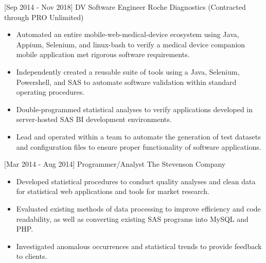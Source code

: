 \documentclass[]{moak-resume}
\begin{document}
\begin{entrylist}
  \entry
    {[Sep 2014 - Nov 2018]}
    {DV Software Engineer}
    {Roche Diagnostics (Contracted through PRO Unlimited)}
    {}
\end{entrylist}
\begin{itemize}
  \setlength\itemsep{-0.4em}
  \item \small\bodyfont Automated an entire mobile-web-medical-device ecosystem using Java, Appium, Selenium, and linux-bash to verify a medical device companion mobile application met rigorous software requirements.
  \item \small\bodyfont Independently created a reusable suite of tools using a Java, Selenium, Powershell, and SAS to automate software validation within standard operating procedures.
  \item \small\bodyfont Double-programmed statistical analyses to verify applications developed in server-hosted SAS BI development environments. 
  \item \small\bodyfont Lead and operated within a team to automate the generation of test datasets and configuration files to ensure proper functionality of software applications.
  \newline
\end{itemize}

\begin{entrylist}
  \entry
    {[Mar 2014 - Aug 2014]}
    {Programmer/Analyst}
    {The Stevenson Company}
    {}
\end{entrylist}
\begin{itemize}
  \setlength\itemsep{-0.4em}
  \item \small\bodyfont Developed statistical procedures to conduct quality analyses and clean data for statistical web applications and tools for market research. 
  \item \small\bodyfont Evaluated existing methods of data processing to improve efficiency and code readability, as well as converting existing SAS programs into MySQL and PHP.
  \item \small\bodyfont Investigated anomalous occurrences and statistical trends to provide feedback to clients.
  \newline
\end{itemize}
\end{document}
